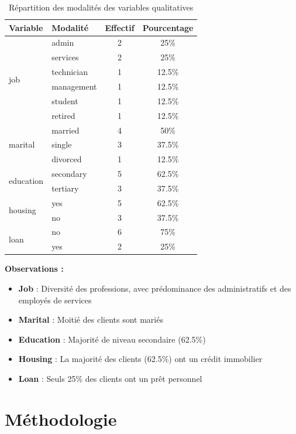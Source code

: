 \documentclass[12pt,a4paper]{article}
\begin{document}
\begin{table}[H]
\centering
\caption{Répartition des modalités des variables qualitatives}
\begin{tabular}{|l|l|c|c|}
\hline
\textbf{Variable} & \textbf{Modalité} & \textbf{Effectif} & \textbf{Pourcentage} \\
\hline
\multirow{6}{*}{job} & admin & 2 & 25\% \\
 & services & 2 & 25\% \\
 & technician & 1 & 12.5\% \\
 & management & 1 & 12.5\% \\
 & student & 1 & 12.5\% \\
 & retired & 1 & 12.5\% \\
\hline
\multirow{3}{*}{marital} & married & 4 & 50\% \\
 & single & 3 & 37.5\% \\
 & divorced & 1 & 12.5\% \\
\hline
\multirow{2}{*}{education} & secondary & 5 & 62.5\% \\
 & tertiary & 3 & 37.5\% \\
\hline
\multirow{2}{*}{housing} & yes & 5 & 62.5\% \\
 & no & 3 & 37.5\% \\
\hline
\multirow{2}{*}{loan} & no & 6 & 75\% \\
 & yes & 2 & 25\% \\
\hline
\end{tabular}
\end{table}

\textbf{Observations :}
\begin{itemize}
    \item \textbf{Job} : Diversité des professions, avec prédominance des administratifs et des employés de services
    \item \textbf{Marital} : Moitié des clients sont mariés
    \item \textbf{Education} : Majorité de niveau secondaire (62.5\%)
    \item \textbf{Housing} : La majorité des clients (62.5\%) ont un crédit immobilier
    \item \textbf{Loan} : Seuls 25\% des clients ont un prêt personnel
\end{itemize}

\section{Méthodologie}
\end{document}
